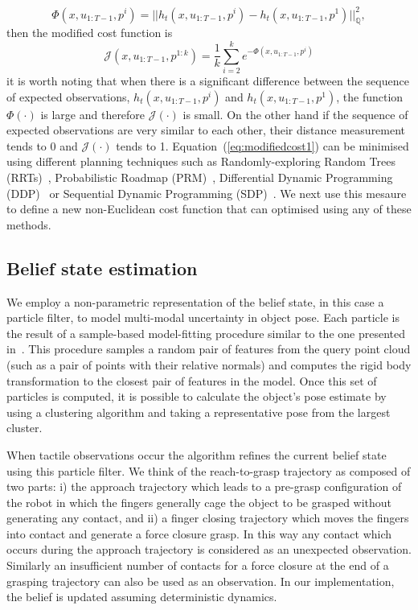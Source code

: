 $$
\Phi(x,u_{1:T-1},p^i)=||h_t(x,u_{1:T-1},p^i)-h_t(x,u_{1:T-1},p^1)||_{\mathbb{Q}}^2,
$$
then the modified cost function is
\begin{equation}\label{eq:modifiedcost1}
\mathcal{J}(x,u_{1:T-1},p^{1:k})=\frac{1}{k}\sum_{i=2}^k{e^{-\Phi(x,u_{1:T-1},p^i)}}
\end{equation}
it is worth noting that when there is a significant difference between the sequence of expected observations, $h_t(x,u_{1:T-1},p^i)$ and $h_t(x,u_{1:T-1},p^1)$, the function $\Phi(\cdot)$ is large and therefore $\mathcal{J}(\cdot)$ is small. On the other hand if the sequence of expected observations are very similar to each other, their distance measurement tends to 0 and $\mathcal{J}(\cdot)$ tends to 1.
Equation~(\ref{eq:modifiedcost1}) can be minimised using different planning techniques such as Randomly-exploring Random Trees (RRTs)~\citep{bib:lavalle_1998}, Probabilistic Roadmap (PRM)~\citep{bib:kavraki_1996}, Differential Dynamic Programming (DDP)~\citep{bib:jacobson_book_1970} or Sequential Dynamic Programming (SDP)~\citep{bib:betts_book_2001}. 
We next use this mesaure to define a new non-Euclidean cost function that can optimised using any of these methods.

\subsection{Belief state estimation}

We employ a non-parametric representation of the belief state, in this case a particle filter, to model multi-modal uncertainty in object pose. Each particle is the result of a sample-based model-fitting procedure similar to the one presented in~\citep{bib:uli_cviu_2011}. This procedure samples a random pair of features from the query point cloud (such as a pair of points with their relative normals) and computes the rigid body transformation to the closest pair of features in the model. Once this set of particles is computed, it is possible to calculate the object's pose estimate by using a clustering algorithm and taking a representative pose from the largest cluster.

When tactile observations occur the algorithm refines the current belief state using this particle filter. We think of the reach-to-grasp trajectory as composed of two parts: i) the approach trajectory which leads to a pre-grasp configuration of the robot in which the fingers generally cage the object to be grasped without generating any contact, and ii) a finger closing trajectory which moves the fingers into contact and generate a force closure grasp. In this way any contact which occurs during the approach trajectory is considered as an unexpected observation. Similarly an insufficient number of contacts for a force closure at the end of a grasping trajectory can also be used as an observation. In our implementation, the belief is updated assuming deterministic dynamics.

